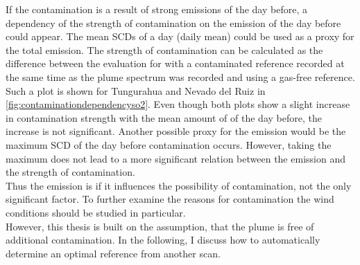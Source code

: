If the contamination is a result of strong emissions of the day before, a dependency of the strength of contamination on the emission of the day before could appear. 
The mean  SCDs of a day (daily mean) could be used as a proxy for the total emission. The strength of contamination can be calculated as the difference between the evaluation for  with a contaminated reference recorded at the same time as the plume spectrum was recorded and using a gas-free reference. Such a plot is shown for Tungurahua and Nevado del Ruiz in \cref{fig:contaminationdependencyso2}. Even though both plots show a slight increase in contamination strength with the mean amount of  of the day before, the increase is not significant. Another possible proxy for the  emission would be the maximum  SCD of the day before contamination occurs. However, taking the maximum does not lead to a more significant relation between the emission and the strength of contamination. \\
Thus the  emission is if it influences the possibility of contamination, not the only significant factor. To further examine the reasons for contamination the wind conditions should be studied in particular.
\\
However, this thesis is built on the assumption, that the plume is free of additional contamination. %
In the following, I discuss how to automatically determine an optimal reference from another scan.